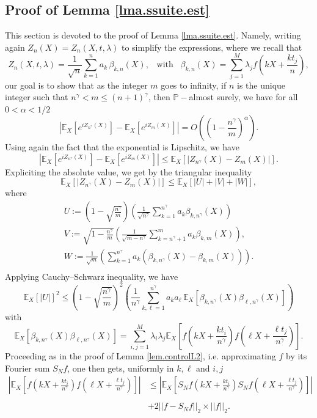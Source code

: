 \documentclass{svproc}
\newcommand{\Prob}{\mathbb{P}}
\newcommand \Esp {\mathbb{E}}
\begin{document}
\subsection{Proof of Lemma \ref{lma.ssuite.est}} \label{sec.ssuite.est}
This section is devoted to the proof of Lemma \ref{lma.ssuite.est}. 
Namely, writing again $Z_n(X)=Z_n(X,t,\lambda)$ to simplify the expressions, where we recall that 
\[
Z_n(X,t,\lambda)= \frac{1}{\sqrt{n}} \sum_{k=1}^n a_k \, \beta_{k,n}(X), \;\; \;\text{with}\;\;\; \beta_{k,n}(X)=\sum_{j=1}^{M}\lambda_j f\left(kX+\frac{kt_j}{n}\right),
\]
our goal is to show that as the integer $m$ goes to infinity, if $n$ is the unique integer such that  $n^{\gamma}<m\leq (n+1)^\gamma$, then $\Prob-$almost surely, we have for all $0<\alpha<1/2$
\[
\left|\Esp_X \left[e^{iZ_{n^\gamma}(X)}\right]-\Esp_X\left[e^{i Z_m(X)}\right]\right| =O\left(\left( 1-\frac{n^{\gamma}}{m}\right)^{\alpha}\right).
\]
Using again the fact that the exponential is Lipschitz, we have
\[
\left| \Esp_X\left[e^{i Z_{n^\gamma}(X)}\right]-\Esp_X\left[e^{i Z_m(X)}\right]\right| \leq  \Esp_X \left[|Z_{n^\gamma}(X)-Z_m(X)|\right].
\]
Expliciting the absolute value, we get by the triangular inequality
\[
\Esp_X \left[|Z_{n^\gamma}(X)-Z_m(X)|\right] \leq \Esp_X\left[|U|+|V|+|W|\right],
\]
where
\[
\begin{array}{ll}
\displaystyle U:=\left(1-\sqrt{\frac{n^{\gamma}}{m}}\right)\left(\frac{1}{\sqrt{n^{\gamma}}} \sum_{k=1}^{n^{\gamma}}a_k \beta_{k,n^{\gamma}}(X) \right)\\
\displaystyle V:=\sqrt{1-\frac{n^{\gamma}}{m}}  \left(\frac{1}{\sqrt{m-n^{\gamma}}}\sum_{k=n^{\gamma}+1}^{m}a_k\beta_{k,m}(X)\right),\\
\displaystyle W:=\frac{1}{\sqrt{m}}\left(\sum_{k=1}^{n^{\gamma}}a_k\left(\beta_{k,n^{\gamma}}(X)-\beta_{k,m}(X)\right)\right).\\
\end{array}
\]
Applying Cauchy--Schwarz inequality, we have 
\[
\Esp_X [|U|]^2 \leq 
\left(1-\sqrt{\frac{n^{\gamma}}{m}}\right)^2\left( \frac{1}{n^{\gamma}} \sum_{k,\ell=1}^{n^{\gamma}} a_k a_{\ell} \, \mathbb E_X [\beta_{k,n^{\gamma}}(X)\beta_{\ell,n^{\gamma}}(X)] \right)
\]
with 
\[
\mathbb E_X [\beta_{k,n^{\gamma}}(X)\beta_{\ell,n^{\gamma}}(X)]=\sum_{i,j=1}^M \lambda_i \lambda_j \mathbb E_X \left[ f\left(kX+\frac{kt_i}{n^{\gamma}}\right)f\left(\ell X+\frac{\ell t_j}{n^{\gamma}}\right) \right]. 
\]
Proceeding as in the proof of Lemma  \ref{lem.controlL2}, i.e. approximating $f$ by its Fourier sum $S_N f$, one then gets, uniformly in $k,\ell$ and $i,j$
\[
\begin{array}{ll}
\displaystyle{\left| \mathbb E_X \left[ f\left(kX+\frac{kt_i}{n^{\gamma}}\right)f\left(\ell X+\frac{\ell t_j}{n^{\gamma}}\right) \right]\right| } & \displaystyle{\leq    \left| \mathbb E_X \left[ S_N f\left(kX+\frac{kt_i}{n^{\gamma}}\right)S_Nf\left(\ell X+\frac{\ell t_j}{n^{\gamma}}\right) \right] \right|}\\
\\
&\displaystyle{+2 ||f-S_N  f||_2 \times ||f||_2}.
\end{array}
\]
\end{document}
